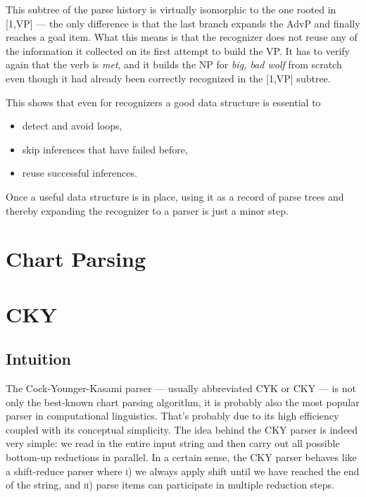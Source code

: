 \begin{examplebox}
\begin{center}
    \end{center}
    This subtree of the parse history is virtually isomorphic to the one rooted in [1,\psep VP] --- the only difference is that the last branch expands the AdvP and finally reaches a goal item.
    What this means is that the recognizer does not reuse any of the information it collected on its first attempt to build the VP\@.
    It has to verify again that the verb is \emph{met}, and it builds the NP for \emph{big, bad wolf} from scratch even though it had already been correctly recognized in the [1,\psep VP] subtree.
\end{examplebox}
%
This shows that even for recognizers a good data structure is essential to
%
\begin{itemize}
    \item detect and avoid loops,
    \item skip inferences that have failed before,
    \item reuse successful inferences.
\end{itemize}
%
Once a useful data structure is in place, using it as a record of parse trees and thereby expanding the recognizer to a parser is just a minor step.

\section{Chart Parsing}

\section{CKY}

\subsection{Intuition}

The Cock-Younger-Kasami parser --- usually abbreviated CYK or CKY --- is not only the best-known chart parsing algorithm, it is probably also the most popular parser in computational linguistics.
That's probably due to its high efficiency coupled with its conceptual simplicity.
The idea behind the CKY parser is indeed very simple: we read in the entire input string and then carry out all possible bottom-up reductions in parallel.
In a certain sense, the CKY parser behaves like a shift-reduce parser where \textsc{i}) we always apply shift until we have reached the end of the string, and \textsc{ii}) parse items can participate in multiple reduction steps.

